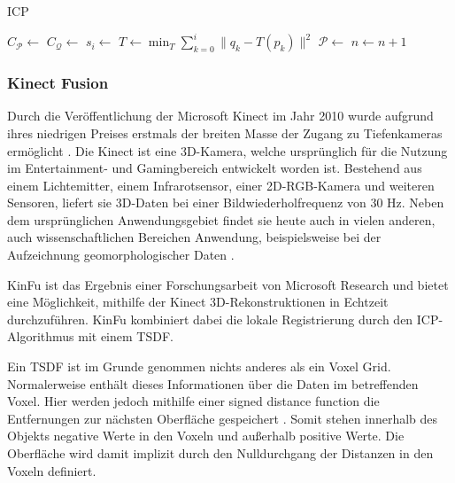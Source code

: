 \begin{algorithm}[H]
\caption[\acl{ICP}]{\acl{ICP} \cite[56]{elkhrachy2008phdthesis}}
\label{alg:icp}
\begin{algorithmic}
\State $C_{\mathcal{P}} \gets$ 
\State $C_{\mathcal{Q}} \gets$ 
\State {}
		\State $s_i \gets$ 
	\EndFor
	\State $T \gets \min_T \sum\limits_{k=0}^{i} \|q_k - T(p_k)\|^2$
	\State $\mathcal{P} \gets$ 
	\State $n \gets n + 1$
\EndWhile
\end{algorithmic}
\end{algorithm}

\subsubsection{Kinect Fusion}
\label{subsubsec:kinfu}

Durch die Veröffentlichung der Microsoft Kinect im Jahr 2010 wurde aufgrund ihres niedrigen Preises erstmals der breiten Masse der Zugang zu Tiefenkameras ermöglicht \cite[1:55]{kinfuTalkYoutube}.
Die Kinect ist eine 3D-Kamera, welche ursprünglich für die Nutzung im Entertainment- und Gamingbereich entwickelt worden ist.
Bestehend aus einem Lichtemitter, einem Infrarotsensor, einer 2D-RGB-Kamera und weiteren Sensoren, liefert sie 3D-Daten bei einer Bildwiederholfrequenz von 30 Hz.
Neben dem ursprünglichen Anwendungsgebiet findet sie heute auch in vielen anderen, auch wissenschaftlichen Bereichen Anwendung, beispielsweise bei der Aufzeichnung geomorphologischer Daten \cite{mankoff2013kinect}.

\ac{KinFu} ist das Ergebnis einer Forschungsarbeit von Microsoft Research \cite{izadi2011kinectfusion, microsoftKinfuYoutube} und bietet eine Möglichkeit, mithilfe der Kinect 3D-Rekonstruktionen in Echtzeit durchzuführen.
\ac{KinFu} kombiniert dabei die lokale Registrierung durch den \ac{ICP}-Algorithmus mit einem \ac{TSDF}.

Ein \ac{TSDF} ist im Grunde genommen nichts anderes als ein Voxel Grid.
Normalerweise enthält dieses Informationen über die Daten im betreffenden Voxel.
Hier werden jedoch mithilfe einer signed distance function die Entfernungen zur nächsten Oberfläche gespeichert \cite{curless1996volumetric}.
Somit stehen innerhalb des Objekts negative Werte in den Voxeln und außerhalb positive Werte.
Die Oberfläche wird damit implizit durch den Nulldurchgang der Distanzen in den Voxeln definiert.

